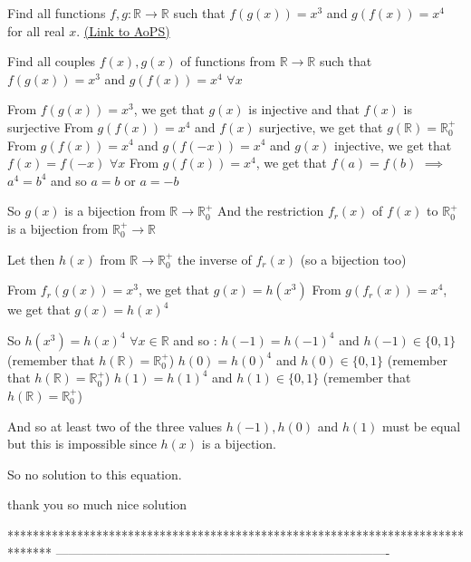 \begin{problem}
	Find all functions $ f,g : \mathbb R\to\mathbb R$ such that $ f(g(x))=x^3$ and $ g(f(x))=x^4$ for all real $x$.
	\flushright \href{https://artofproblemsolving.com/community/c6h316350}{(Link to AoPS)}
\end{problem}



\begin{solution}
	\begin{tcolorbox}Find all couples $ f(x),g(x)$ of functions from $ \mathbb R\to\mathbb R$ such that $ f(g(x))=x^3$ and $ g(f(x))=x^4$ $ \forall x$\end{tcolorbox}

From $ f(g(x))=x^3$, we get that $ g(x)$ is injective and that $ f(x)$ is surjective
From $ g(f(x))=x^4$ and $ f(x)$ surjective, we get that $ g(\mathbb R)=\mathbb R^+_0$
From $ g(f(x))=x^4$ and $ g(f(-x))=x^4$ and $ g(x)$ injective, we get that $ f(x)=f(-x)$ $ \forall x$
From $ g(f(x))=x^4$, we get that $ f(a)=f(b)$ $ \implies$ $ a^4=b^4$ and so $ a=b$ or $ a=-b$

So $ g(x)$ is a bijection from $ \mathbb R\to\mathbb R^+_0$
And the restriction $ f_r(x)$ of $ f(x)$ to $ \mathbb R^+_0$ is a bijection from $ \mathbb R^+_0\to\mathbb R$

Let then $ h(x)$ from $ \mathbb R\to\mathbb R^+_0$ the inverse of $ f_r(x)$ (so a bijection too)

From $ f_r(g(x))=x^3$, we get that $ g(x)=h(x^3)$
From $ g(f_r(x))=x^4$, we get that $ g(x)=h(x)^4$

So $ h(x^3)=h(x)^4$ $ \forall x\in\mathbb R$ and so :
$ h(-1)=h(-1)^4$ and $ h(-1)\in\{0,1\}$ (remember that $ h(\mathbb R)=\mathbb R^+_0$)
$ h(0)=h(0)^4$ and $ h(0)\in\{0,1\}$ (remember that $ h(\mathbb R)=\mathbb R^+_0$)
$ h(1)=h(1)^4$ and $ h(1)\in\{0,1\}$ (remember that $ h(\mathbb R)=\mathbb R^+_0$)

And so at least two of the three values $ h(-1),h(0)$ and $ h(1)$ must be equal but this is impossible since $ h(x)$ is a bijection.

So no solution to this equation.
\end{solution}



\begin{solution}
	thank you so much nice solution  
\end{solution}
*******************************************************************************
-------------------------------------------------------------------------------

